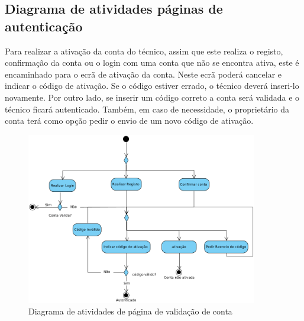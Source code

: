 \newpage

\subsection{Diagrama de atividades páginas de autenticação}

Para realizar a ativação da conta do técnico, assim que este realiza o registo, confirmação da conta ou o login com uma conta que não se encontra ativa, este é encaminhado para o ecrã de ativação da conta. Neste ecrã poderá cancelar e indicar o código de ativação. Se o código estiver errado, o técnico deverá inseri-lo novamente. Por outro lado, se inserir um código correto a conta será validada e o técnico ficará autenticado. Também, em caso de necessidade, o proprietário da conta terá como opção pedir o envio de um novo código de ativação.

\begin{figure}[htb]
  \centering
  \includegraphics[width=0.9\textwidth]{images/diagramas/atividades/diagrama_atividades_autenticação.png}
  \caption{Diagrama de atividades de página de validação de conta}
  \label{fig:39}
\end{figure}

\newpage




